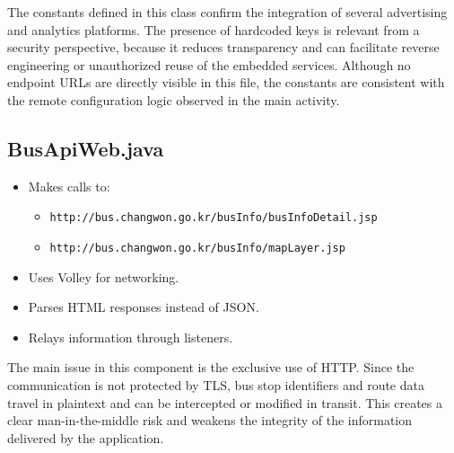 The constants defined in this class confirm the integration of several advertising and analytics platforms. The presence of hardcoded keys is relevant from a security perspective, because it reduces transparency and can facilitate reverse engineering or unauthorized reuse of the embedded services. Although no endpoint URLs are directly visible in this file, the constants are consistent with the remote configuration logic observed in the main activity.

\subsection{BusApiWeb.java}
\begin{itemize}
    \item Makes calls to:
    \begin{itemize}
        \item \texttt{http://bus.changwon.go.kr/busInfo/busInfoDetail.jsp}
        \item \texttt{http://bus.changwon.go.kr/busInfo/mapLayer.jsp}
    \end{itemize}
    \item Uses Volley for networking.
    \item Parses HTML responses instead of JSON.
    \item Relays information through listeners.
\end{itemize}

The main issue in this component is the exclusive use of HTTP. Since the communication is not protected by TLS, bus stop identifiers and route data travel in plaintext and can be intercepted or modified in transit. This creates a clear man-in-the-middle risk and weakens the integrity of the information delivered by the application.

